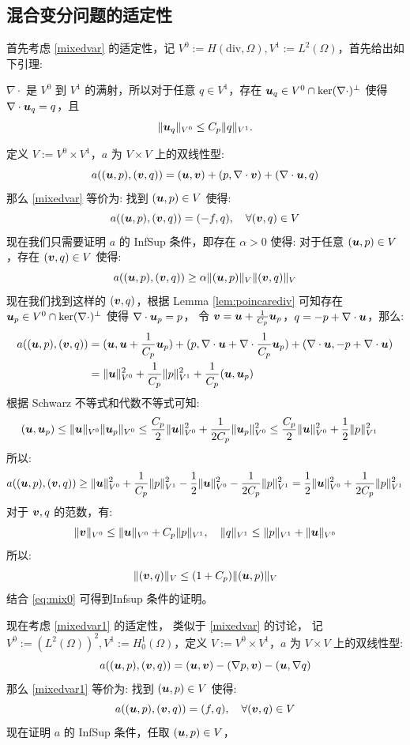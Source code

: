 \documentclass[lang=cn,a4paper,newtx]{elegantpaper}
\begin{document}
\subsection{混合变分问题的适定性}
首先考虑 \eqref{mixedvar} 的适定性，记 $V^0 := H(\mathrm{div}, \Omega), 
V^1 := L^2(\Omega)$，首先给出如下引理:
\begin{lemma}
\label{lem:poincarediv}
 $\nabla \cdot$ 是 $V^0$ 到 $V^1$ 的满射，所以对于任意
$q\in V^1$，存在 $\boldsymbol{u}_q\in V^0 \cap \ker(\nabla\cdot)^{\perp}$ 
使得 $\nabla\cdot \boldsymbol{u}_q = q$，且
$$
\|\boldsymbol{u}_q\|_{V^0} \leq C_p\|q\|_{V^1}.
$$
\end{lemma}
定义 $V := V^0\times V^1$，$a$ 为 $V\times V$ 上的双线性型:
$$
a((\boldsymbol{u}, p), (\boldsymbol{v}, q)) = (\boldsymbol{u}, \boldsymbol{v}) + (p, \nabla\cdot \boldsymbol{v}) + (\nabla\cdot \boldsymbol{u}, q)
$$
那么 \eqref{mixedvar} 等价为: 找到 $(\boldsymbol{u}, p)\in V$ 使得:
$$
a((\boldsymbol{u}, p), (\boldsymbol{v}, q)) = (-f, q), \quad \forall (\boldsymbol{v}, q)\in V
$$
现在我们只需要证明 $a$ 的 InfSup 条件，即存在 $\alpha > 0$ 使得: 对于任意 $(\boldsymbol{u},
p)\in V$，存在 $(\boldsymbol{v}, q)\in V$ 使得:
$$
a((\boldsymbol{u}, p), (\boldsymbol{v}, q)) \geq \alpha\|(\boldsymbol{u}, p)\|_V\|(\boldsymbol{v}, q)\|_V
$$
现在我们找到这样的 $(\boldsymbol{v}, q)$，根据 Lemma \ref{lem:poincarediv} 可知存在
$\boldsymbol{u}_p\in V^0\cap \ker(\nabla\cdot)^{\perp}$ 使得 $\nabla\cdot \boldsymbol{u}_p = p$，
令 $\boldsymbol{v} = \boldsymbol{u} + \frac{1}{C_p}\boldsymbol{u}_p$，$q = -p + \nabla\cdot \boldsymbol{u}$，那么:
$$
\begin{aligned}
a((\boldsymbol{u}, p), (\boldsymbol{v}, q)) & = (\boldsymbol{u}, \boldsymbol{u} + \frac{1}{C_p}\boldsymbol{u}_p) + (p, \nabla\cdot \boldsymbol{u} + \nabla
\cdot \frac{1}{C_p}\boldsymbol{u}_p) + (\nabla\cdot \boldsymbol{u}, -p + \nabla\cdot \boldsymbol{u})\\
& = \|\boldsymbol{u}\|_{V^0}^2 + \frac{1}{C_p}\|p\|_{V^1}^2 + \frac{1}{C_p}(\boldsymbol{u}, \boldsymbol{u}_p)\\
\end{aligned}
$$
根据 Schwarz 不等式和代数不等式可知:
$$
\begin{aligned}
    (\boldsymbol{u}, \boldsymbol{u}_p) & \leq \|\boldsymbol{u}\|_{V^0}\|\boldsymbol{u}_p\|_{V^0} \leq
    \frac{C_p}{2}\|\boldsymbol{u}\|_{V^0}^2 + \frac{1}{2C_p}\|\boldsymbol{u}_p\|_{V^0}^2
    \leq \frac{C_p}{2}\|\boldsymbol{u}\|_{V^0}^2 + \frac{1}{2}\|p\|_{V^1}^2
\end{aligned}
$$
所以:
\begin{equation}
\label{eq:mix0}
a((\boldsymbol{u}, p), (\boldsymbol{v}, q)) \geq \|\boldsymbol{u} \|_{V^0}^2 + \frac{1}{C_p}\|p\|_{V^1}^2 
- \frac{1}{2}\|\boldsymbol{u}\|_{V^0}^2 - \frac{1}{2C_p}\|p\|_{V^1}^2
= \frac{1}{2}\|\boldsymbol{u}\|_{V^0}^2 + \frac{1}{2C_p}\|p\|_{V^1}^2
\end{equation}
对于 $\boldsymbol{v}, q$ 的范数，有:
$$
\|\boldsymbol{v}\|_{V^0} \leq \|\boldsymbol{u}\|_{V^0} + C_p\|p\|_{V^1}, \quad
\|q\|_{V^1} \leq \|p\|_{V^1} + \|\boldsymbol{u}\|_{V^0}
$$
所以:
$$
\|(\boldsymbol{v}, q)\|_V \leq (1 + C_p)\|(\boldsymbol{u}, p)\|_V
$$
结合 \eqref{eq:mix0} 可得到Infsup 条件的证明。

现在考虑 \eqref{mixedvar1} 的适定性，
类似于 \eqref{mixedvar} 的讨论，
记 $V^0 := (L^2(\Omega))^2, V^1 :=
H^1_0(\Omega)$，定义 $V := V^0\times V^1$，$a$ 为 $V\times V$ 上的双线性型:
$$
a((\boldsymbol{u}, p), (\boldsymbol{v}, q)) = (\boldsymbol{u}, \boldsymbol{v}) - (\nabla p, \boldsymbol{v}) - (\boldsymbol{u}, \nabla q)
$$
那么 \eqref{mixedvar1} 等价为: 找到 $(\boldsymbol{u}, p)\in V$ 使得:
$$
a((\boldsymbol{u}, p), (\boldsymbol{v}, q)) = (f, q), \quad \forall (\boldsymbol{v}, q)\in V
$$
现在证明 $a$ 的 InfSup 条件，任取 $(\boldsymbol{u}, p)\in V$，
 
\end{document}
